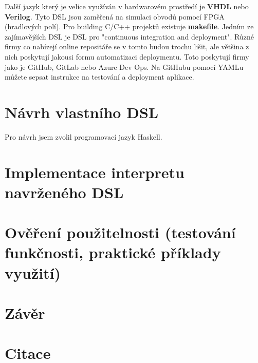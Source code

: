 \documentclass[male,czech]{kithesis}
\begin{document}
Další jazyk který je velice využíván v hardwarovém prostředí je \textbf{VHDL} nebo \textbf{Verilog}. Tyto DSL jsou zaměřená
na simulaci obvodů pomocí FPGA (hradlových polí). Pro building C/C++ projektů existuje \textbf{makefile}. Jedním ze zajímavějších
DSL je DSL pro "continuous integration and deployment". Různé firmy co nabízejí online repositáře se v tomto budou trochu lišit, ale
většina z nich poskytují jakousi formu automatizaci deploymentu. Toto poskytují firmy jako je GitHub,
GitLab nebo Azure Dev Ops. Na GitHubu pomocí YAMLu můžete sepsat instrukce na testování a deployment aplikace.

\pagebreak
\centering
{}

\chapter{Návrh vlastního DSL}
Pro návrh jsem zvolil programovací jazyk Haskell. 

\chapter{Implementace interpretu navrženého DSL}

\chapter{Ověření použitelnosti (testování funkčnosti, praktické příklady využití)}

\chapter{Závěr}

\chapter{Citace}


\cite{Katuscakc}
\cite{IntroToLLVM}
\printbibliography


\appendix
\end{document}
